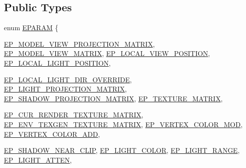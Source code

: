 \subsection*{Public Types}
\begin{CompactItemize}
\item 
enum \hyperlink{class_gr_shader_2f004c603bb97711d05eb68381a5a7ba}{EPARAM} \{ \par
\hyperlink{class_gr_shader_2f004c603bb97711d05eb68381a5a7ba30e37abd2fd8b590c15664405e826b85}{EP\_\-MODEL\_\-VIEW\_\-PROJECTION\_\-MATRIX}, 
\hyperlink{class_gr_shader_2f004c603bb97711d05eb68381a5a7ba771c68fe14e6f3d88ceab8faa6b409e0}{EP\_\-MODEL\_\-VIEW\_\-MATRIX}, 
\hyperlink{class_gr_shader_2f004c603bb97711d05eb68381a5a7ba5fb8b055e849e72981bbccd2019bdcd8}{EP\_\-LOCAL\_\-VIEW\_\-POSITION}, 
\hyperlink{class_gr_shader_2f004c603bb97711d05eb68381a5a7ba5e5bd686b1a544fca8ccd8172614ac52}{EP\_\-LOCAL\_\-LIGHT\_\-POSITION}, 
\par
\hyperlink{class_gr_shader_2f004c603bb97711d05eb68381a5a7baf6e9d758af54b6143f365279e578b26a}{EP\_\-LOCAL\_\-LIGHT\_\-DIR\_\-OVERRIDE}, 
\hyperlink{class_gr_shader_2f004c603bb97711d05eb68381a5a7baf849900dac3995949e0c3b9b78d3fd53}{EP\_\-LIGHT\_\-PROJECTION\_\-MATRIX}, 
\hyperlink{class_gr_shader_2f004c603bb97711d05eb68381a5a7babfde6f4b246ad7c4925577065f67841e}{EP\_\-SHADOW\_\-PROJECTION\_\-MATRIX}, 
\hyperlink{class_gr_shader_2f004c603bb97711d05eb68381a5a7ba044e51cf06ee7b28315c5162ecac92df}{EP\_\-TEXTURE\_\-MATRIX}, 
\par
\hyperlink{class_gr_shader_2f004c603bb97711d05eb68381a5a7baabc9a760b45ea9435385731ca546ac12}{EP\_\-CUR\_\-RENDER\_\-TEXTURE\_\-MATRIX}, 
\hyperlink{class_gr_shader_2f004c603bb97711d05eb68381a5a7baaebe8f389fe4e9c1cf88232822ed6db6}{EP\_\-ENV\_\-TEXGEN\_\-TEXTURE\_\-MATRIX}, 
\hyperlink{class_gr_shader_2f004c603bb97711d05eb68381a5a7ba53e6fa76e5acfea0ca6ed613667346b2}{EP\_\-VERTEX\_\-COLOR\_\-MOD}, 
\hyperlink{class_gr_shader_2f004c603bb97711d05eb68381a5a7babca9fc6c0444334899a6d1c2b6da7a4b}{EP\_\-VERTEX\_\-COLOR\_\-ADD}, 
\par
\hyperlink{class_gr_shader_2f004c603bb97711d05eb68381a5a7bad3821a583087b6f09500c427bb2c9136}{EP\_\-SHADOW\_\-NEAR\_\-CLIP}, 
\hyperlink{class_gr_shader_2f004c603bb97711d05eb68381a5a7ba7018c4410472cd890a2e12990994dc96}{EP\_\-LIGHT\_\-COLOR}, 
\hyperlink{class_gr_shader_2f004c603bb97711d05eb68381a5a7bab4efd66311bfcdd650de1fbc296c315f}{EP\_\-LIGHT\_\-RANGE}, 
\hyperlink{class_gr_shader_2f004c603bb97711d05eb68381a5a7bad6e079e2952c61ea73b33b0be55ae1bb}{EP\_\-LIGHT\_\-ATTEN}, 
\par

\end{CompactItemize}
